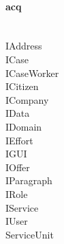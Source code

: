\documentclass[../main.tex]{subfiles}
\begin{document}
\paragraph{acq}\mbox{} \\
IAddress \\
ICase \\
ICaseWorker \\
ICitizen \\
ICompany \\
IData \\
IDomain \\
IEffort \\
IGUI \\
IOffer \\
IParagraph \\
IRole \\
IService \\
IUser \\
ServiceUnit
\end{document}
